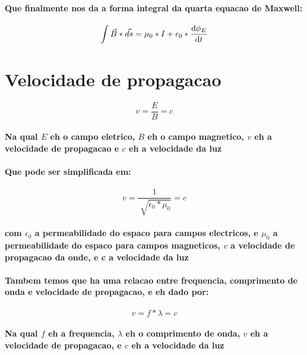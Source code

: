 \documentclass[12pt,twoside, a4paper, twocolumn]{article}
\begin{document}
\paragraph*{Que finalmente nos da a forma integral da quarta equacao de Maxwell:}
\begin{equation}
    \int \vec{B} * \vec{ds} = \mu_0 * I + \epsilon_0 * \frac{\mathrm d \phi_E}{\mathrm d t}
\end{equation}

\section{Velocidade de propagacao}
\begin{equation}
    v = \frac{E}{B} = c
\end{equation}
\paragraph*{Na qual $E$ eh o campo eletrico, $B$ eh o campo magnetico, $v$ eh a velocidade de propagacao e $c$ eh a velocidade da luz}
\paragraph*{Que pode ser simplificada em:}
\begin{equation}
    v = \frac{1}{\sqrt[]{\epsilon_0 * \mu_0}} = c
\end{equation}
\paragraph*{com $\epsilon_0$ a permeabilidade do espaco para campos electricos, e $\mu_0$ a permeabilidade do espaco para campos magneticos, $v$ a velocidade de propagacao da onde, e c a velocidade da luz}

\paragraph*{Tambem temos que ha uma relacao entre frequencia, comprimento de onda e velocidade de propagacao, e eh dado por:}

\begin{equation}
    v = f * \lambda = c
\end{equation}

\paragraph*{Na qual $f$ eh a frequencia, $\lambda$ eh o comprimento de onda, $v$ eh a velocidade de propagacao, e $c$ eh a velocidade da luz}
\end{document}
